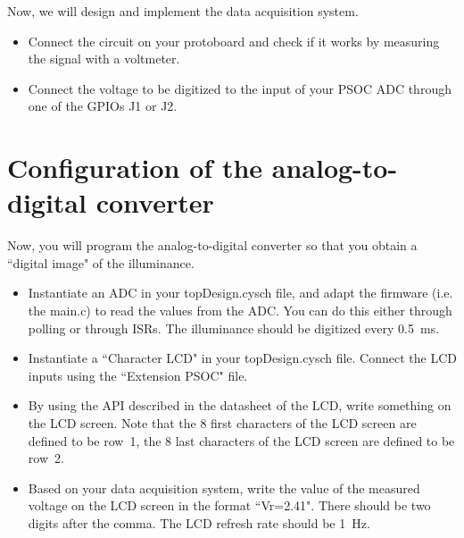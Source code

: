 \documentclass[11pt,a4paper]{article}
\theoremstyle{definition}%
\begin{document}
Now, we will design and implement the data acquisition system.
\begin{itemize}
	\item Connect the circuit on your protoboard and check if it works by measuring the signal with a voltmeter.
	\item Connect the voltage to be digitized to the input of your PSOC ADC through one of the GPIOs J1 or J2. 
\end{itemize}









\section{Configuration of the analog-to-digital converter}
Now, you will program the analog-to-digital converter so that you obtain a ``digital image" of the illuminance.
\begin{itemize}
	\item Instantiate an ADC in your topDesign.cysch file, and adapt the firmware (i.e. the main.c) to read the values from the ADC. You can do this either through polling or through ISRs. The illuminance should be digitized every 0.5~ms. 
	\item Instantiate a ``Character LCD" in your topDesign.cysch file. Connect the LCD inputs using the ``Extension PSOC" file. 
	\item By using the API described in the datasheet of the LCD, write something on the LCD screen. Note that the 8 first characters of the LCD screen are defined to be row~1, the 8 last characters of the LCD screen are defined to be row~2. 
	\item Based on your data acquisition system, write the value of the measured voltage on the LCD screen in the format ``Vr=2.41". There should be two digits after the comma. The LCD refresh rate should be 1~Hz. 
\end{itemize}
\end{document}
